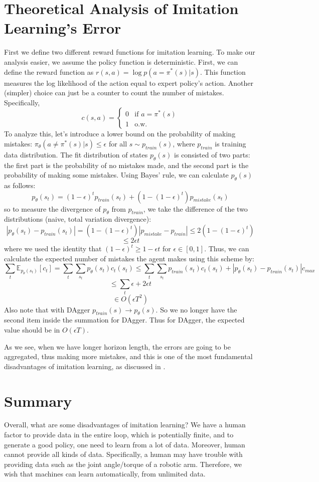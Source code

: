 \section{Theoretical Analysis of Imitation Learning's Error}
First we define two different reward functions for imitation learning. To make our analysis easier, we assume the policy function is deterministic. First, we can define the reward function as $r(s,a)=\log p(a=\pi^*(s)|s)$. This function measures the log likelihood of the action equal to expert policy's action. Another (simpler) choice can just be a counter to count the number of mistakes. Specifically, 
\[ c(s,a) = \begin{cases} 
          0 & \text{if } a = \pi^*(s) \\
          1 & \text{o.w.}
       \end{cases}
    \]
To analyze this, let's introduce a lower bound on the probability of making mistakes: $\pi_\theta(a\neq \pi^*(s)|s)\leq \epsilon$ for all $s\sim p_{train}(s)$, where $p_{train}$ is training data distribution. The fit distribution of states $p_\theta(s)$ is consisted of two parts: the first part is the probability of no mistakes made, and the second part is the probability of making some mistakes. Using Bayes' rule, we can calculate $p_\theta(s)$ as follows:
$$p_\theta(s_t) = (1-\epsilon)^tp_{train}(s_t)+(1-(1-\epsilon)^t)p_{mistake}(s_t)$$
so to measure the divergence of $p_\theta$ from $p_{train}$, we take the difference of the two distributions (naive, total variation divergence):
$$|p_\theta(s_t)-p_{train}(s_t)|=(1-(1-\epsilon)^t)|p_{mistake}-p_{train}|\leq2(1-(1-\epsilon)^t)$$
$$\leq 2\epsilon t$$
where we used the identity that $(1-\epsilon)^t\geq1-\epsilon t$ for $\epsilon\in [0,1]$. Thus, we can calculate the expected number of mistakes the agent makes using this scheme by:
$$\sum_t\mathbb{E}_{p_\theta(s_t)}[c_t] = \sum_t\sum_{s_t}p_\theta(s_t)c_t(s_t)\leq\sum_t\sum_{s_t}p_{train}(s_t)c_t(s_t)+|p_\theta(s_t)-p_{train}(s_t)|c_{max}$$
$$\leq\sum_t\epsilon+2\epsilon t$$
$$\in O(\epsilon T^2)$$
Also note that with DAgger $p_{train}(s)\rightarrow p_\theta(s)$. So we no longer have the second item inside the summation for DAgger. Thus for DAgger, the expected value should be in $O(\epsilon T)$.

As we see, when we have longer horizon length, the errors are going to be aggregated, thus making more mistakes, and this is one of the most fundamental disadvantages of imitation learning, as discussed in \cite{ross2011reduction}.
\section{Summary}
Overall, what are some disadvantages of imitation learning? We have a human factor to provide data in the entire loop, which is potentially finite, and to generate a good policy, one need to learn from a lot of data. Moreover, human cannot provide all kinds of data. Specifically, a human may have trouble with providing data such as the joint angle/torque of a robotic arm. Therefore, we wish that machines can learn automatically, from unlimited data.